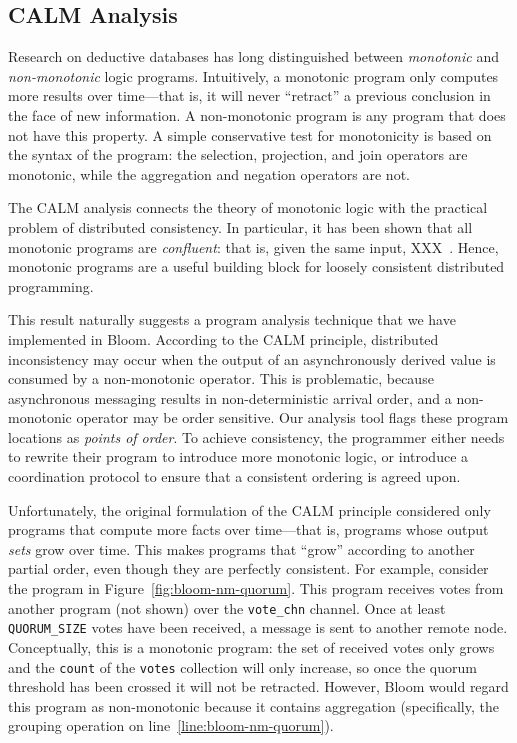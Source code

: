 \subsection{CALM Analysis}
\label{sec:bg-calm}

Research on deductive databases has long distinguished between \emph{monotonic}
and \emph{non-monotonic} logic programs. Intuitively, a monotonic program only
computes more results over time---that is, it will never ``retract'' a previous
conclusion in the face of new information. A non-monotonic program is any
program that does not have this property. A simple conservative test for
monotonicity is based on the syntax of the program: the selection, projection,
and join operators are monotonic, while the aggregation and negation operators
are not.

The CALM analysis connects the theory of monotonic logic with the practical
problem of distributed consistency. In particular, it has been shown that all
monotonic programs are \emph{confluent}: that is, given the same input,
XXX~\cite{Ameloot2011}. Hence, monotonic programs are a useful building block
for loosely consistent distributed programming.

This result naturally suggests a program analysis technique that we have
implemented in Bloom. According to the CALM principle, distributed inconsistency
may occur when the output of an asynchronously derived value is consumed by a
non-monotonic operator. This is problematic, because asynchronous messaging
results in non-deterministic arrival order, and a non-monotonic operator may be
order sensitive. Our analysis tool flags these program locations as \emph{points
  of order}. To achieve consistency, the programmer either needs to rewrite
their program to introduce more monotonic logic, or introduce a coordination
protocol to ensure that a consistent ordering is agreed upon.

Unfortunately, the original formulation of the CALM principle considered only
programs that compute more facts over time---that is, programs whose output
\emph{sets} grow over time. This makes programs that ``grow'' according to
another partial order, even though they are perfectly consistent. For example,
consider the program in Figure~\ref{fig:bloom-nm-quorum}. This program receives
votes from another program (not shown) over the \texttt{vote\_chn} channel. Once
at least \texttt{QUORUM\_SIZE} votes have been received, a message is sent to
another remote node. Conceptually, this is a monotonic program: the set of
received votes only grows and the \texttt{count} of the \texttt{votes}
collection will only increase, so once the quorum threshold has been crossed it
will not be retracted. However, Bloom would regard this program as non-monotonic
because it contains aggregation (specifically, the grouping operation on
line~\ref{line:bloom-nm-quorum}).

